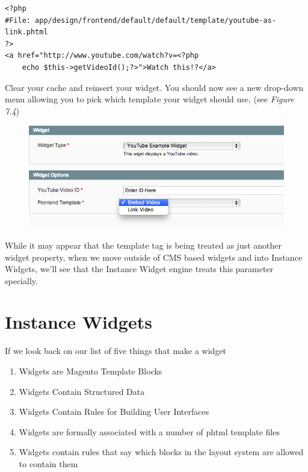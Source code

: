 \documentclass[oneside]{book}
\begin{document}
\begin{lstlisting}
<?php 
#File: app/design/frontend/default/default/template/youtube-as-link.phtml 
?>
<a href="http://www.youtube.com/watch?v=<?php 
    echo $this->getVideoId();?>">Watch this!?</a>

\end{lstlisting}


Clear your cache and reinsert your widget.  You should now see a new drop-down menu allowing you to pick which template your widget should use, (see \emph{Figure 7.4}) 

\begin{figure}[htb]
\begin{center}
\leavevmode
\includegraphics[width=1\textwidth]{images/chapter7/with-template.png}
\end{center}
\caption{}
\end{figure}


While it may appear that the template tag is being treated as just another widget property, when we move outside of CMS based widgets and into Instance Widgets, we'll see that the Instance Widget engine treats this parameter specially.

\section{Instance Widgets}

If we look back on our list of five things that make a widget

\begin{enumerate}
\item Widgets are Magento Template Blocks
\item Widgets Contain Structured Data
\item Widgets Contain Rules for Building User Interfaces
\item Widgets are formally associated with a number of phtml template files
\item Widgets contain rules that say which blocks in the layout system are allowed to contain them
\end{enumerate}
\end{document}
